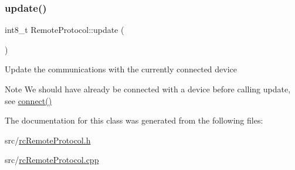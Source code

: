 \subsubsection{\texorpdfstring{update()}{update()}}
{\footnotesize\ttfamily int8\+\_\+t Remote\+Protocol\+::update (\begin{DoxyParamCaption}{ }\end{DoxyParamCaption})}

Update the communications with the currently connected device

\begin{DoxyNote}{Note}
We should have already be connected with a device before calling update, see \hyperlink{classRemoteProtocol_a0948e420ac812906e683fb47041287b8}{connect()} 
\end{DoxyNote}


The documentation for this class was generated from the following files\+:\begin{DoxyCompactItemize}
\item 
src/\hyperlink{rcRemoteProtocol_8h}{rc\+Remote\+Protocol.\+h}\item 
src/\hyperlink{rcRemoteProtocol_8cpp}{rc\+Remote\+Protocol.\+cpp}\end{DoxyCompactItemize}
